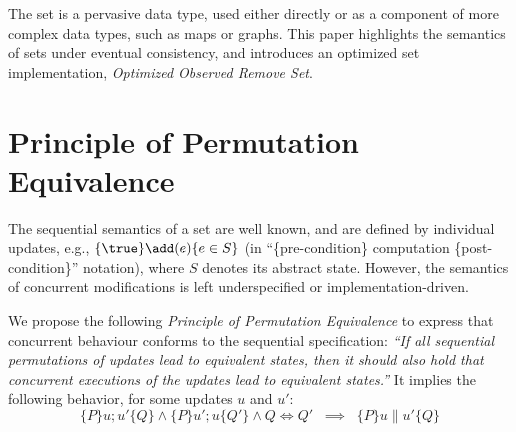 \documentclass[a4paper]{article}
\begin{document}
The set is a pervasive data type, used either directly or as a component of
more complex data types, such as maps or graphs.  
This paper highlights the semantics of sets under eventual consistency, and
introduces an optimized set implementation, \emph{Optimized Observed Remove
Set}.










\section{Principle of Permutation Equivalence}
\label{sec:permutation-eq}

The sequential semantics of a set are well known, and are defined by
individual updates, e.g., $\{ \true \} \add(e) \{ e \in S \}$ (in
``\{pre-condition\} computation \{post-condition\}'' notation), where
$S$ denotes its abstract state.
However, the semantics of concurrent modifications is left underspecified or implementation-driven.








We propose the following \emph{Principle of Permutation Equivalence}
\cite{BZPSBBD12} 
to express that concurrent behaviour conforms to the
sequential specification:
\emph{``If all sequential permutations of updates lead to equivalent states,
then it should also hold that concurrent executions of the updates lead to
equivalent states.'' }
It implies the following behavior, for some updates $u$ and $u'$: $$\{P\}
u;u' \{Q\} \land \{P\} u';u \{Q'\} \land Q \Leftrightarrow Q' \;\; \implies
\;\; \{P\} u \parallel u' \{Q\}$$
\end{document}
